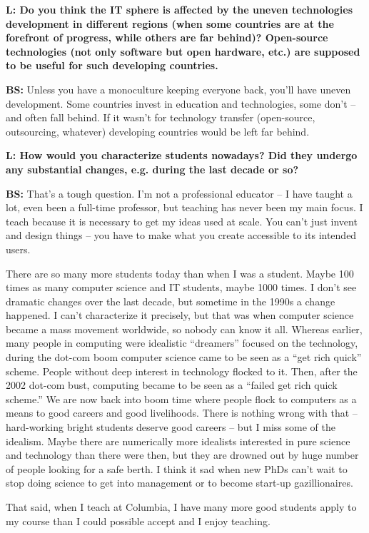 \documentclass[10pt, a5paper]{article}
\begin{document}
\begin{Parallel}[p]{}{}
{{\noindent \bf L:  Do you think the IT sphere is affected by the uneven technologies development in different regions (when some countries are at the forefront of progress, while others are far behind)? Open-source technologies (not only software but open hardware, etc.) are supposed to be useful for such developing countries.}

{\noindent \bf BS:} Unless you have a monoculture keeping everyone back, you’ll have uneven development. Some countries invest in education and technologies, some don’t – and often fall behind. If it wasn’t for technology transfer (open-source, outsourcing, whatever) developing countries would be left far behind.

{\noindent \bf L: How would you characterize students nowadays? Did they undergo any substantial changes, e.g. during the last decade or so?}

{\noindent \bf BS:} That’s a tough question. I’m not a professional educator – I have taught a lot, even been a full-time professor, but teaching has never been my main focus. I teach because it is necessary to get my ideas used at scale. You can’t just invent and design things – you have to make what you create accessible to its intended users.

There are so many more students today than when I was a student. Maybe 100 times as many computer science and IT students, maybe 1000 times. I don’t see dramatic changes over the last decade, but sometime in the 1990s a change happened. I can’t characterize it precisely, but that was when computer science became a mass movement worldwide, so nobody can know it all. Whereas earlier, many people in computing were idealistic “dreamers” focused on the technology, during the dot-com boom computer science came to be seen as a “get rich quick” scheme. People without deep interest in  technology flocked to it. Then, after the 2002 dot-com bust, computing became to be seen as a “failed get rich quick scheme.” We are now back into boom time where people flock to computers as a means to good careers and good livelihoods. There is nothing wrong with that – hard-working bright students deserve good careers – but I miss some of the idealism. Maybe there are numerically more idealists interested in pure science and technology than there were then, but they are drowned out by huge number of people looking for a safe berth. I think it sad when new PhDs can’t wait to stop doing science to get into management or to become start-up gazillionaires.

That said, when I teach at Columbia, I have many more good students apply to my course than I could possible accept and I enjoy teaching.

}
\end{Parallel}
\end{document}
